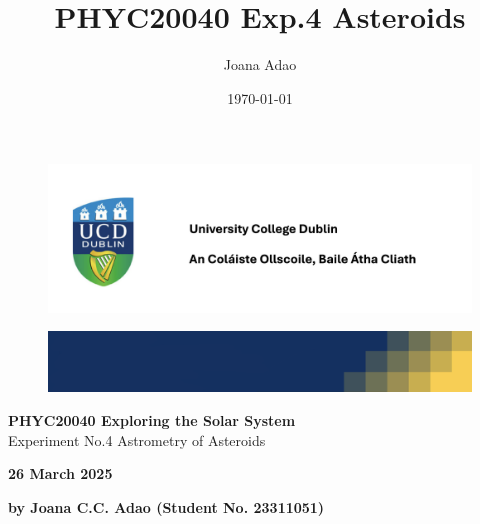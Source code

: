 \documentclass[12pt]{article}
\title{PHYC20040 Exp.4 Asteroids}
\author{Joana Adao}
\date{\today}
\begin{document}
\begin{titlepage}
    \begin{center}

        \begin{figure}[ht]
            \includegraphics[width=\textwidth]{UCDLogo.png}
        \end{figure}
        
        \begin{figure}
            \centerline{\includegraphics[width=\paperwidth]{UCDBanner.png}}
        \end{figure}

        \vspace{4cm}

        {\LARGE \bfseries PHYC20040 Exploring the Solar System}\\
        \vspace{0.75cm}
        {\Large Experiment No.4 Astrometry of Asteroids}
        
        \vspace{1cm}
    
    {\Large \textbf{26 March 2025}}

    \vspace{2cm}
    
    {\large \textbf{by Joana C.C. Adao (Student No. 23311051)}}\\

    \end{center}

   \clearpage

\end{titlepage}

\tableofcontents
\thispagestyle{empty}

\newpage
\end{document}
